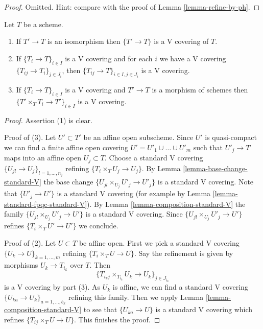 \begin{proof}
Omitted. Hint: compare with the proof of
Lemma \ref{lemma-refine-by-ph}.
\end{proof}

\begin{lemma}
\label{lemma-V}
Let $T$ be a scheme.
\begin{enumerate}
\item If $T' \to T$ is an isomorphism then $\{T' \to T\}$
is a V covering of $T$.
\item If $\{T_i \to T\}_{i\in I}$ is a V covering and for each
$i$ we have a V covering $\{T_{ij} \to T_i\}_{j\in J_i}$, then
$\{T_{ij} \to T\}_{i \in I, j\in J_i}$ is a V covering.
\item If $\{T_i \to T\}_{i\in I}$ is a V covering
and $T' \to T$ is a morphism of schemes then
$\{T' \times_T T_i \to T'\}_{i\in I}$ is a V covering.
\end{enumerate}
\end{lemma}

\begin{proof}
Assertion (1) is clear.

\medskip\noindent
Proof of (3).
Let $U' \subset T'$ be an affine open subscheme.
Since $U'$ is quasi-compact we can find a finite affine open
covering $U' = U'_1 \cup \ldots \cup U'_m$ such that
$U'_j \to T$ maps into an affine open $U_j \subset T$.
Choose a standard V covering $\{U_{jl} \to U_j\}_{l = 1, \ldots, n_j}$
refining $\{T_i \times_T U_j \to U_j\}$.
By Lemma \ref{lemma-base-change-standard-V}
the base change $\{U_{jl} \times_{U_j} U'_j \to U'_j\}$
is a standard V covering. Note that $\{U'_j \to U'\}$
is a standard V covering
(for example by Lemma \ref{lemma-standard-fpqc-standard-V}).
By Lemma \ref{lemma-composition-standard-V} 
the family $\{U_{jl} \times_{U_j} U'_j \to U'\}$
is a standard V covering. Since
$\{U_{jl} \times_{U_j} U'_j \to U'\}$ refines $\{T_i \times_T U' \to U'\}$
we conclude.

\medskip\noindent
Proof of (2).
Let $U \subset T$ be affine open. First we pick a standard V covering
$\{U_k \to U\}_{k = 1, \ldots, m}$ refining
$\{T_i \times_T U \to U\}$.
Say the refinement is given by morphisms $U_k \to T_{i_k}$ over $T$.
Then
$$
\{T_{i_kj} \times_{T_{i_k}} U_k \to U_k\}_{j \in J_{i_k}}
$$
is a V covering by part (3). As $U_k$ is affine,
we can find a standard V covering
$\{U_{ka} \to U_k\}_{a = 1, \ldots, b_k}$ refining this family.
Then we apply Lemma \ref{lemma-composition-standard-V}
to see that $\{U_{ka} \to U\}$ is a standard V covering which
refines $\{T_{ij} \times_T U \to U\}$. This finishes the proof.
\end{proof}

